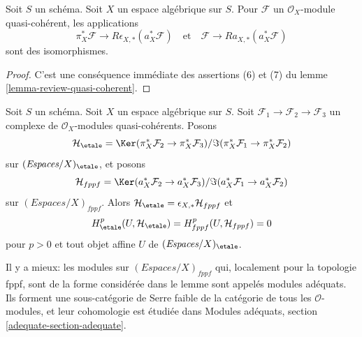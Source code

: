 \begin{lemma}
\label{lemma-cohomological-descent-etale-fppf-modules}
Soit $S$ un schéma. Soit $X$ un espace algébrique sur $S$.
Pour $\mathcal{F}$ un $\mathcal{O}_X$-module quasi-cohérent, les applications
$$
\pi_X^*\mathcal{F} \longrightarrow R\epsilon_{X, *}(a_X^*\mathcal{F})
\quad\text{et}\quad
\mathcal{F} \longrightarrow Ra_{X, *}(a_X^*\mathcal{F})
$$
sont des isomorphismes.
\end{lemma}

\begin{proof}
C'est une conséquence immédiate des assertions (6) et (7) du lemme
\ref{lemma-review-quasi-coherent}.
\end{proof}

\begin{lemma}
\label{lemma-vanishing-adequate}
Soit $S$ un schéma. Soit $X$ un espace algébrique sur $S$.
Soit $\mathcal{F}_1 \to \mathcal{F}_2 \to \mathcal{F}_3$
un complexe de $\mathcal{O}_X$-modules quasi-cohérents.
Posons
$$
\mathcal{H}_\etale =
\Ker(\pi_X^*\mathcal{F}_2 \to \pi_X^*\mathcal{F}_3)/
\Im(\pi_X^*\mathcal{F}_1 \to \pi_X^*\mathcal{F}_2)
$$
sur $(\textit{Espaces}/X)_\etale$, et posons
$$
\mathcal{H}_{fppf} =
\Ker(a_X^*\mathcal{F}_2 \to a_X^*\mathcal{F}_3)/
\Im(a_X^*\mathcal{F}_1 \to a_X^*\mathcal{F}_2)
$$
sur $(\textit{Espaces}/X)_{fppf}$.
Alors $\mathcal{H}_\etale = \epsilon_{X, *}\mathcal{H}_{fppf}$ et
$$
H^p_\etale(U, \mathcal{H}_\etale) = H^p_{fppf}(U, \mathcal{H}_{fppf}) = 0
$$
pour $p > 0$ et tout objet affine $U$ de $(\textit{Espaces}/X)_\etale$.
\end{lemma}

\noindent
Il y a mieux: les modules sur $(\textit{Espaces}/X)_{fppf}$ qui, localement pour
la topologie fppf, sont de la forme considérée dans le lemme sont appelés
modules adéquats. Ils forment une sous-catégorie de Serre faible de la catégorie
de tous les $\mathcal{O}$-modules, et leur cohomologie est étudiée dans Modules
adéquats, section \ref{adequate-section-adequate}.

